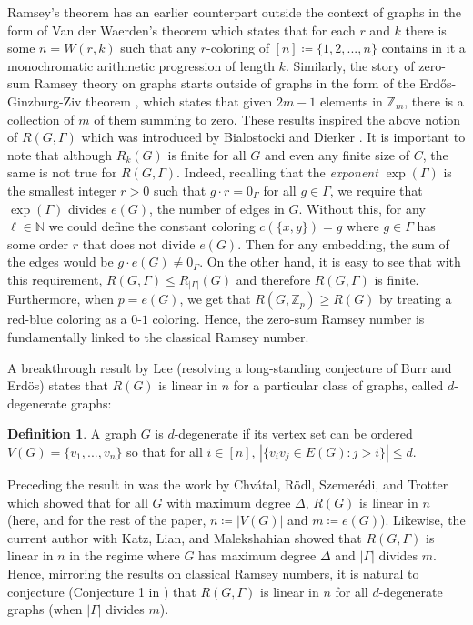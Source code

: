 \documentclass{article}
\theoremstyle{definition}
\newtheorem{defn}[theorem]{Definition}
\begin{document}
Ramsey's theorem has an earlier counterpart outside the context of graphs in the form of Van der Waerden's theorem \cite{zbMATH02580955} which states that for each $r$ and $k$ there is some $n=W(r,k)$ such that any $r$-coloring of $[n]\coloneqq \{1,2,...,n\}$ contains in it a monochromatic arithmetic progression of length $k$. Similarly, the story of zero-sum Ramsey theory on graphs starts outside of graphs in the form of the Erd\H{o}s-Ginzburg-Ziv theorem \cite{EGZ}, which states that given $2m-1$ elements in $\mathbb{Z}_m$, there is a collection of $m$ of them summing to zero. These results inspired the above notion of $R(G,\Gamma)$ which was introduced by Bialostocki and Dierker \cite{BD92}. It is important to note that although $R_k(G)$ is finite for all $G$ and even any finite size of $C$, the same is not true for $R(G,\Gamma)$. Indeed, recalling that the \emph{exponent} $\exp(\Gamma)$ is the smallest integer $r>0$ such that $g\cdot r=0_\Gamma$ for all $g\in \Gamma$, we require that $\exp(\Gamma)$ divides $e(G)$, the number of edges in $G$. Without this, for any $\ell\in \mathbb{N}$ we could define the constant coloring $c(\{x,y\})=g$ where $g\in \Gamma$ has some order $r$ that does not divide $e(G)$. Then for any embedding, the sum of the edges would be $g\cdot e(G)\neq 0_{\Gamma}$. On the other hand, it is easy to see that with this requirement, $R(G, \Gamma)\leq R_{|\Gamma|}(G)$ and therefore $R(G, \Gamma)$ is finite. Furthermore, when $p=e(G)$, we get that $R(G,\mathbb{Z}_p)\geq R(G)$ by treating a red-blue coloring as a $0$-$1$ coloring. Hence, the zero-sum Ramsey number is fundamentally linked to the classical Ramsey number. 


A breakthrough result by Lee \cite{Lee17} (resolving a long-standing conjecture of Burr and Erd\"os) states that $R(G)$ is linear in $n$ for a particular class of graphs, called $d$-degenerate graphs: 
\begin{defn}
    A graph $G$ is $d$-degenerate if its vertex set can be ordered $V(G)=\{v_1,...,v_n\}$ so that for all $i\in [n]$, $|\{v_iv_j\in E(G):j>i\}|\leq d.$
\end{defn}
Preceding the result in \cite{Lee17} was the work by Chv\'atal,
R\"odl, Szemer\'edi, and Trotter \cite{ChRSzT} which showed that for all $G$ with maximum degree $\Delta$, $R(G)$ is linear in $n$ (here, and for the rest of the paper, $n\coloneqq |V(G)|$ and $m\coloneqq e(G)$). Likewise, the current author with Katz, Lian, and Malekshahian \cite{bounded_degree} showed that $R(G,\Gamma)$ is linear in $n$ in the regime where $G$ has maximum degree $\Delta$ and $|\Gamma|$ divides $m$. Hence, mirroring the results on classical Ramsey numbers, it is natural to conjecture (Conjecture 1 in \cite{bounded_degree}) that $R(G,\Gamma)$ is linear in $n$ for all $d$-degenerate graphs (when $|\Gamma|$ divides $m$). 
\end{document}
